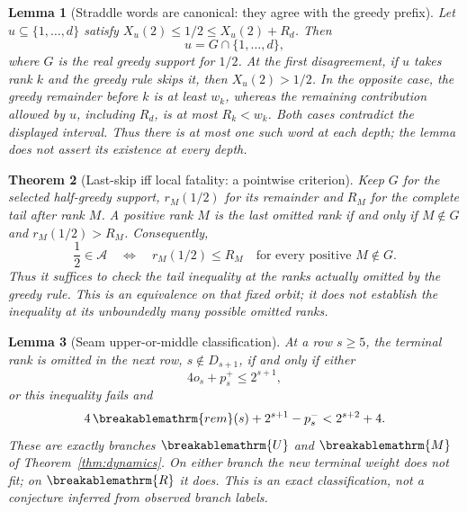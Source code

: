 \documentclass[11pt]{article}
\theoremstyle{plain}
\newtheorem{thm}{Theorem}[section]
\newtheorem{lem}[thm]{Lemma}
\theoremstyle{definition}
\theoremstyle{remark}
\renewcommand{\mathrm}[1]{\ifmmode\breakablemathrm{#1}\else\textrm{#1}\fi}%
\begin{document}
\begin{lem}[Straddle words are canonical: they agree with the greedy prefix]
\label{lem:straddle-agrees-greedy}
Let $u\subseteq\{1,\ldots,d\}$ satisfy
$X_u(2)\le1/2\le X_u(2)+R_d$.  Then
\[
 u=G\cap\{1,\ldots,d\},
\]
where $G$ is the real greedy support for $1/2$.
At the first disagreement, if $u$ takes rank $k$ and the greedy rule
skips it, then $X_u(2)>1/2$.  In the opposite case, the greedy
remainder before $k$ is at least $w_k$, whereas the remaining
contribution allowed by $u$, including $R_d$, is at most
$R_k<w_k$.  Both cases contradict the displayed interval.  Thus there is at most one such word
at each depth; the lemma does not assert its existence at every depth.
\end{lem}

\begin{thm}[Last-skip iff local fatality: a pointwise criterion]
\label{thm:last-skip-iff-fatal}
Keep $G$ for the selected half-greedy support, $r_M(1/2)$ for its
remainder and $R_M$ for the complete tail after rank $M$.
A positive rank $M$ is the last omitted rank if and only if
$M\notin G$ and $r_M(1/2)>R_M$.  Consequently,
\[
 \frac12\in\mathcal A
 \quad\Longleftrightarrow\quad
 r_M(1/2)\le R_M\quad\text{for every positive }M\notin G.
\]
Thus it suffices to check the tail inequality at the ranks actually
omitted by the greedy rule.  This is an equivalence on that fixed orbit;
it does not establish the inequality at its unboundedly many possible
omitted ranks.
\end{thm}

\begin{lem}[Seam upper-or-middle classification]
\label{lem:seam-upper-or-middle}
At a row $s\ge5$, the terminal rank is omitted in the next row,
$s\notin D_{s+1}$, if and only if either
\[
 4o_s+p_s^+\le2^{s+1},
\]
or this inequality fails and
\[
 4\,\mathrm{rem}(s)+2^{s+1}-p_s^-<2^{s+2}+4.
\]
These are exactly branches $\mathrm U$ and $\mathrm M$ of
Theorem~\ref{thm:dynamics}.  On either branch the new terminal weight
does not fit; on $\mathrm R$ it does.  This is an exact
classification, not a conjecture inferred from observed branch labels.
\end{lem}
\end{document}
